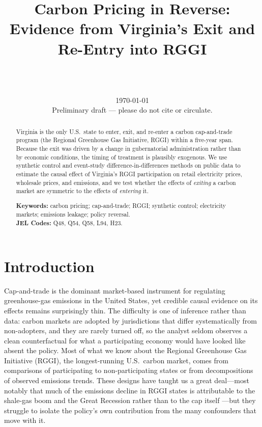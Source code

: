 \documentclass[12pt]{article}
\title{Carbon Pricing in Reverse:\\
       Evidence from Virginia's Exit and Re-Entry into RGGI}
\author{%
  \TODO{Author Name}\\
  \TODO{Affiliation}\\
  \texttt{\TODO{email}}%
}
\date{\today \\[0.5em] \footnotesize Preliminary draft --- please do not cite or circulate.}
\begin{document}
\maketitle

\begin{abstract}
\noindent
{} Virginia is the only U.S.\ state to enter, exit, and re-enter a
carbon cap-and-trade program (the Regional Greenhouse Gas Initiative, RGGI) within a
five-year span. Because the exit was driven by a change in gubernatorial administration
rather than by economic conditions, the timing of treatment is plausibly exogenous. We
use synthetic control and event-study difference-in-differences methods on public data to
estimate the causal effect of Virginia's RGGI participation on retail electricity prices,
wholesale prices, and \co{} emissions, and we test whether the effects of \emph{exiting}
a carbon market are symmetric to the effects of \emph{entering} it. 

\medskip
\noindent\textbf{Keywords:} carbon pricing; cap-and-trade; RGGI; synthetic control;
electricity markets; emissions leakage; policy reversal.\\
\noindent\textbf{JEL Codes:} Q48, Q54, Q58, L94, H23.
\end{abstract}

\clearpage
\tableofcontents
\clearpage

\section{Introduction}\label{sec:intro}

Cap-and-trade is the dominant market-based instrument for regulating greenhouse-gas
emissions in the United States, yet credible causal evidence on its effects remains
surprisingly thin. The difficulty is one of inference rather than data: carbon markets are
adopted by jurisdictions that differ systematically from non-adopters, and they are rarely
turned off, so the analyst seldom observes a clean counterfactual for what a participating
economy would have looked like absent the policy. Most of what we know about the Regional
Greenhouse Gas Initiative (RGGI), the longest-running U.S.\ carbon market, comes from
comparisons of participating to non-participating states or from decompositions of observed
emissions trends. These designs have taught us a great deal---most notably that much of the
emissions decline in RGGI states is attributable to the shale-gas boom and the Great
Recession rather than to the cap itself \citep{Murray2015_rggi_attribution}---but they
struggle to isolate the policy's own contribution from the many confounders that move with it.
\end{document}
